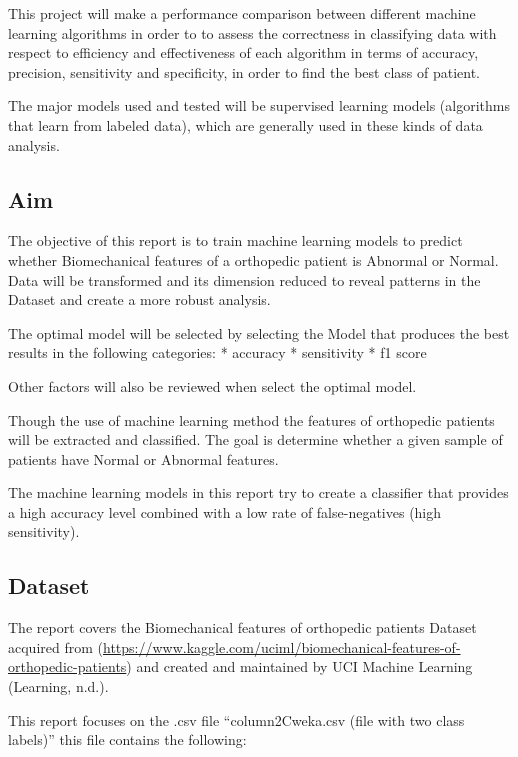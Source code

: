 \documentclass[
]{article}
\begin{document}
This project will make a performance comparison between different
machine learning algorithms in order to to assess the correctness in
classifying data with respect to efficiency and effectiveness of each
algorithm in terms of accuracy, precision, sensitivity and specificity,
in order to find the best class of patient.

The major models used and tested will be supervised learning models
(algorithms that learn from labeled data), which are generally used in
these kinds of data analysis.

\hypertarget{aim}{%
\subsection{Aim}\label{aim}}

The objective of this report is to train machine learning models to
predict whether Biomechanical features of a orthopedic patient is
Abnormal or Normal. Data will be transformed and its dimension reduced
to reveal patterns in the Dataset and create a more robust analysis.

The optimal model will be selected by selecting the Model that produces
the best results in the following categories: * accuracy * sensitivity *
f1 score

Other factors will also be reviewed when select the optimal model.

Though the use of machine learning method the features of orthopedic
patients will be extracted and classified. The goal is determine whether
a given sample of patients have Normal or Abnormal features.

The machine learning models in this report try to create a classifier
that provides a high accuracy level combined with a low rate of
false-negatives (high sensitivity).

\hypertarget{dataset}{%
\subsection{Dataset}\label{dataset}}

The report covers the Biomechanical features of orthopedic patients
Dataset acquired from
(\url{https://www.kaggle.com/uciml/biomechanical-features-of-orthopedic-patients})
and created and maintained by UCI Machine Learning (Learning, n.d.).

This report focuses on the .csv file ``column2Cweka.csv (file with two
class labels)'' this file contains the following:
\end{document}
